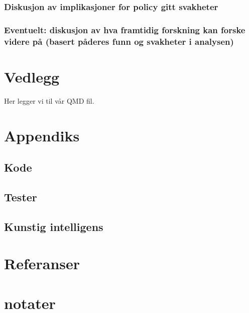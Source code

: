 \documentclass[
  12pt,
  a4paper,
  DIV=11,
  numbers=noendperiod]{scrartcl}
\begin{document}
\subsubsection{Diskusjon av implikasjoner for policy gitt
svakheter}\label{diskusjon-av-implikasjoner-for-policy-gitt-svakheter}

\subsubsection{Eventuelt: diskusjon av hva framtidig forskning kan
forske videre på (basert påderes funn og svakheter i
analysen)}\label{eventuelt-diskusjon-av-hva-framtidig-forskning-kan-forske-videre-puxe5-basert-puxe5deres-funn-og-svakheter-i-analysen}

\newpage

\section*{Vedlegg}\label{vedlegg}

Her legger vi til vår QMD fil.

\section*{Appendiks}\label{appendiks}

\subsection*{Kode}\label{kode}

\subsection*{Tester}\label{tester}

\subsection*{Kunstig intelligens}\label{kunstig-intelligens}

\newpage

\section*{Referanser}\label{referanser}

\section{notater}\label{notater}
\end{document}
